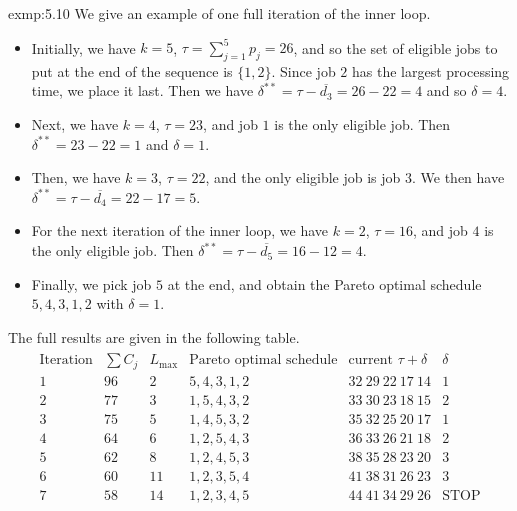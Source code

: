 \begin{exmp}{exmp:5.10}
    We give an example of one full iteration of the inner loop.
    \begin{itemize}
        \item Initially, we have $k = 5$, $\tau = \sum_{j=1}^5 p_j = 26$, and 
        so the set of eligible jobs to put at the end of the sequence is $\{1, 2\}$.
        Since job $2$ has the largest processing time, we place it last. 
        Then we have $\delta^{**} = \tau - \overline{d_3} = 26 - 22 = 4$ and so
        $\delta = 4$. 
        \item Next, we have $k = 4$, $\tau = 23$, and job $1$ is the 
        only eligible job. Then $\delta^{**} = 23 - 22 = 1$ and $\delta = 1$. 
        \item Then, we have $k = 3$, $\tau = 22$, and the only eligible job is 
        job $3$. We then have $\delta^{**} = \tau - \overline{d_4} = 22 - 17 = 5$.
        \item For the next iteration of the inner loop, we have $k = 2$, $\tau = 16$, 
        and job $4$ is the only eligible job. Then $\delta^{**} = \tau 
        - \overline{d_5} = 16 - 12 = 4$.
        \item Finally, we pick job $5$ at the end, and obtain the Pareto optimal 
        schedule $5, 4, 3, 1, 2$ with $\delta = 1$.
    \end{itemize} 
    The full results are given in the following table. 
    \begin{align*}
        \begin{array}{c|c|c|c|c|c}
            \text{Iteration} & \sum C_j & L_{\max} & \text{Pareto optimal schedule} 
            & \text{current } \tau + \delta & \delta \\ \hline 
            1 & 96 & 2 & 5, 4, 3, 1, 2 & 32~29~22~17~14 & 1 \\ 
            2 & 77 & 3 & 1, 5, 4, 3, 2 & 33~30~23~18~15 & 2 \\ 
            3 & 75 & 5 & 1, 4, 5, 3, 2 & 35~32~25~20~17 & 1 \\ 
            4 & 64 & 6 & 1, 2, 5, 4, 3 & 36~33~26~21~18 & 2 \\ 
            5 & 62 & 8 & 1, 2, 4, 5, 3 & 38~35~28~23~20 & 3 \\ 
            6 & 60 & 11 & 1, 2, 3, 5, 4 & 41~38~31~26~23 & 3 \\ 
            7 & 58 & 14 & 1, 2, 3, 4, 5 & 44~41~34~29~26 & \text{STOP} 
        \end{array}
    \end{align*} 
\end{exmp}

